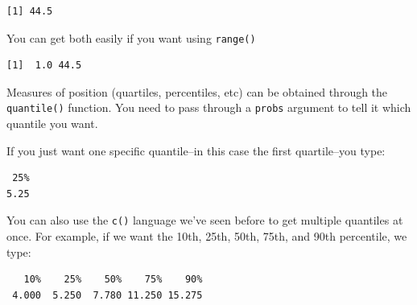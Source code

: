 \documentclass[
  letterpaper,
]{book}
\newenvironment{Shaded}{\begin{snugshade}}{\end{snugshade}}
\newcommand{\AttributeTok}[1]{\textcolor[rgb]{0.40,0.45,0.13}{#1}}
\newcommand{\DecValTok}[1]{\textcolor[rgb]{0.68,0.00,0.00}{#1}}
\newcommand{\FunctionTok}[1]{\textcolor[rgb]{0.28,0.35,0.67}{#1}}
\newcommand{\NormalTok}[1]{\textcolor[rgb]{0.00,0.23,0.31}{#1}}
\newcommand{\SpecialCharTok}[1]{\textcolor[rgb]{0.37,0.37,0.37}{#1}}
\begin{document}
\begin{verbatim}
[1] 44.5
\end{verbatim}

You can get both easily if you want using \texttt{range()}

\begin{Shaded}
\end{Shaded}

\begin{verbatim}
[1]  1.0 44.5
\end{verbatim}

Measures of position (quartiles, percentiles, etc) can be obtained
through the \texttt{quantile()} function. You need to pass through a
\texttt{probs} argument to tell it which quantile you want.

If you just want one specific quantile--in this case the first
quartile--you type:

\begin{Shaded}
\end{Shaded}

\begin{verbatim}
 25% 
5.25 
\end{verbatim}

You can also use the \texttt{c()} language we've seen before to get
multiple quantiles at once. For example, if we want the 10th, 25th,
50th, 75th, and 90th percentile, we type:

\begin{Shaded}
\end{Shaded}

\begin{verbatim}
   10%    25%    50%    75%    90% 
 4.000  5.250  7.780 11.250 15.275 
\end{verbatim}
\end{document}
